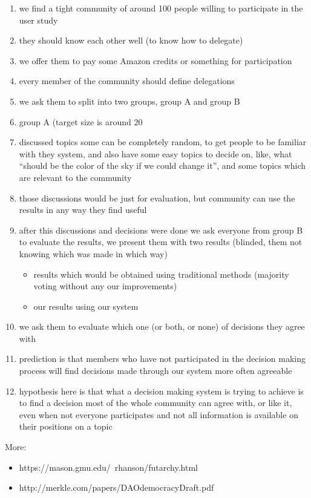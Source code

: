 \documentclass{sigchi}
\begin{document}
\begin{enumerate}
\item we find a tight community of around 100 people willing to participate in the user study
\item they should know each other well (to know how to delegate)
\item we offer them to pay some Amazon credits or something for participation
\item every member of the community should define delegations
\item we ask them to split into two groups, group A and group B
\item group A (target size is around 20%
\item discussed topics some can be completely random, to get people to be familiar with they system, and also have some
easy topics to decide on, like, what ``should be the color of the sky if we could change it'', and some topics which are relevant to the community
\item those discussions would be just for evaluation, but community can use the results in any way they find useful
\item after this discussions and decisions were done we ask everyone from group B to evaluate the results, we present them with two results (blinded, them not knowing which was made in which way)
\begin{itemize}
\item results which would be obtained using traditional methods (majority voting without any our improvements)
\item our results using our system
\end{itemize}
\item we ask them to evaluate which one (or both, or none) of decisions they agree with
\item prediction is that members who have not participated in the decision making process will
find decisions made through our system more often agreeable
\item hypothesis here is that what a decision making system is trying to achieve is to find a decision most of the
whole community can agree with, or like it, even when not everyone participates and not all information is available
on their positions on a topic
\end{enumerate}




More:
\begin{itemize}
\item https://mason.gmu.edu/~rhanson/futarchy.html
\item http://merkle.com/papers/DAOdemocracyDraft.pdf
\end{itemize}
\end{document}
